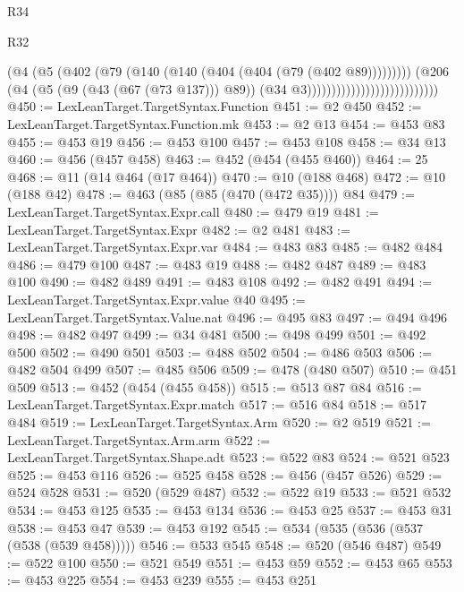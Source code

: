 \begin{lexlean}{R34}
\begin{lexlean}{R32}
\begin{coremodule}
{{{{{{{{{{{{{{{{{{{{{{{{{{{{{{{{{{{{{{{{{{{{{{{{{{{                                                  (@4
                                                    (@5
                                                      (@402
                                                        (@79
                                                          (@140
                                                            (@140
                                                              (@404 (@404 (@79 (@402 @89)))))))))
                                                    (@206
                                                      (@4
                                                        (@5 (@9 (@43 (@67 (@73 @137))) @89))
                                                        (@34 @3)))))))))))))))))))))))))))
@450 := LexLeanTarget.TargetSyntax.Function
@451 := @2 @450
@452 := LexLeanTarget.TargetSyntax.Function.mk
@453 := @2 @13
@454 := @453 @83
@455 := @453 @19
@456 := @453 @100
@457 := @453 @108
@458 := @34 @13
@460 := @456 (@457 @458)
@463 := @452 (@454 (@455 @460))
@464 := 25
@468 := @11 (@14 @464 (@17 @464))
@470 := @10 (@188 @468)
@472 := @10 (@188 @42)
@478 := @463 (@85 (@85 (@470 (@472 @35)))) @84
@479 := LexLeanTarget.TargetSyntax.Expr.call
@480 := @479 @19
@481 := LexLeanTarget.TargetSyntax.Expr
@482 := @2 @481
@483 := LexLeanTarget.TargetSyntax.Expr.var
@484 := @483 @83
@485 := @482 @484
@486 := @479 @100
@487 := @483 @19
@488 := @482 @487
@489 := @483 @100
@490 := @482 @489
@491 := @483 @108
@492 := @482 @491
@494 := LexLeanTarget.TargetSyntax.Expr.value @40
@495 := LexLeanTarget.TargetSyntax.Value.nat
@496 := @495 @83
@497 := @494 @496
@498 := @482 @497
@499 := @34 @481
@500 := @498 @499
@501 := @492 @500
@502 := @490 @501
@503 := @488 @502
@504 := @486 @503
@506 := @482 @504 @499
@507 := @485 @506
@509 := @478 (@480 @507)
@510 := @451 @509
@513 := @452 (@454 (@455 @458))
@515 := @513 @87 @84
@516 := LexLeanTarget.TargetSyntax.Expr.match
@517 := @516 @84
@518 := @517 @484
@519 := LexLeanTarget.TargetSyntax.Arm
@520 := @2 @519
@521 := LexLeanTarget.TargetSyntax.Arm.arm
@522 := LexLeanTarget.TargetSyntax.Shape.adt
@523 := @522 @83
@524 := @521 @523
@525 := @453 @116
@526 := @525 @458
@528 := @456 (@457 @526)
@529 := @524 @528
@531 := @520 (@529 @487)
@532 := @522 @19
@533 := @521 @532
@534 := @453 @125
@535 := @453 @134
@536 := @453 @25
@537 := @453 @31
@538 := @453 @47
@539 := @453 @192
@545 := @534 (@535 (@536 (@537 (@538 (@539 @458)))))
@546 := @533 @545
@548 := @520 (@546 @487)
@549 := @522 @100
@550 := @521 @549
@551 := @453 @59
@552 := @453 @65
@553 := @453 @225
@554 := @453 @239
@555 := @453 @251
}}}}}}}}}}}}}}}}}}}}}}}}}}}}}}}}}}}}}}}}}}}}}}}}}}}
\end{coremodule}
\end{lexlean}
\end{lexlean}
